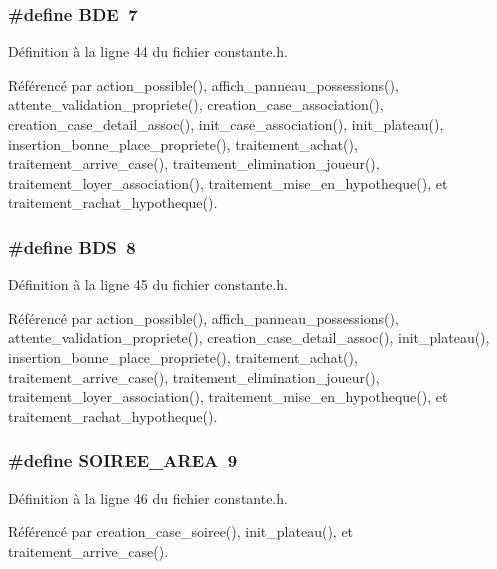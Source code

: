 \subsubsection{\setlength{\rightskip}{0pt plus 5cm}\#define BDE~7}\label{constante_8h_0ad5592728506d2c7a17844fa23df7d8}




D\'{e}finition \`{a} la ligne 44 du fichier constante.h.

R\'{e}f\'{e}renc\'{e} par action\_\-possible(), affich\_\-panneau\_\-possessions(), attente\_\-validation\_\-propriete(), creation\_\-case\_\-association(), creation\_\-case\_\-detail\_\-assoc(), init\_\-case\_\-association(), init\_\-plateau(), insertion\_\-bonne\_\-place\_\-propriete(), traitement\_\-achat(), traitement\_\-arrive\_\-case(), traitement\_\-elimination\_\-joueur(), traitement\_\-loyer\_\-association(), traitement\_\-mise\_\-en\_\-hypotheque(), et traitement\_\-rachat\_\-hypotheque().
\subsubsection{\setlength{\rightskip}{0pt plus 5cm}\#define BDS~8}\label{constante_8h_c4176015f152fb7416bc61129a3825f7}




D\'{e}finition \`{a} la ligne 45 du fichier constante.h.

R\'{e}f\'{e}renc\'{e} par action\_\-possible(), affich\_\-panneau\_\-possessions(), attente\_\-validation\_\-propriete(), creation\_\-case\_\-detail\_\-assoc(), init\_\-plateau(), insertion\_\-bonne\_\-place\_\-propriete(), traitement\_\-achat(), traitement\_\-arrive\_\-case(), traitement\_\-elimination\_\-joueur(), traitement\_\-loyer\_\-association(), traitement\_\-mise\_\-en\_\-hypotheque(), et traitement\_\-rachat\_\-hypotheque().
\subsubsection{\setlength{\rightskip}{0pt plus 5cm}\#define SOIREE\_\-AREA~9}\label{constante_8h_63930fef1b459edd3f8abb747d3f43b4}




D\'{e}finition \`{a} la ligne 46 du fichier constante.h.

R\'{e}f\'{e}renc\'{e} par creation\_\-case\_\-soiree(), init\_\-plateau(), et traitement\_\-arrive\_\-case().
